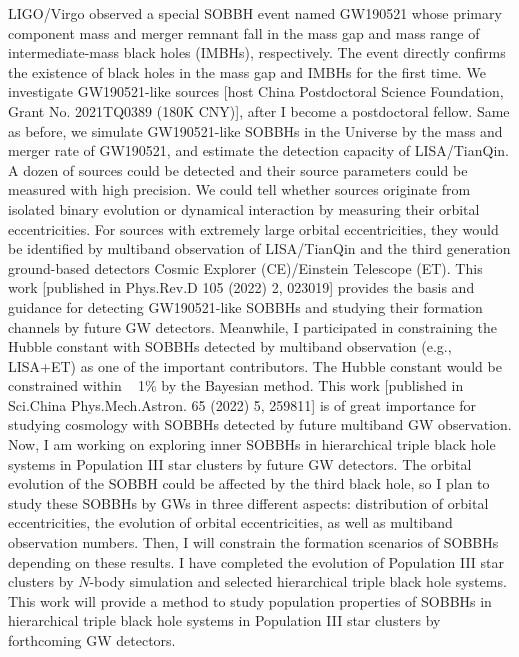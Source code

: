 \documentclass[12pt,a4paper,sans]{article}%
\begin{document}
LIGO/Virgo observed a special SOBBH event named
GW190521 whose primary component mass and merger remnant fall in the mass gap and mass range of intermediate-mass black holes (IMBHs), respectively. The event directly confirms the existence of
black holes in the mass gap and IMBHs for the first time. We investigate GW190521-like sources [host China Postdoctoral Science Foundation, Grant No. 2021TQ0389 (180K CNY)], after I become a postdoctoral fellow. Same as before, we simulate GW190521-like SOBBHs in the
Universe by the mass and merger rate of GW190521, and estimate the detection capacity of LISA/TianQin. A dozen of sources could be detected and their source
parameters could be measured with high precision. We could tell whether sources originate from isolated binary evolution or dynamical interaction by measuring their orbital eccentricities. For sources with extremely large orbital
eccentricities, they would be identified by multiband observation of LISA/TianQin and the third generation ground-based detectors Cosmic Explorer (CE)/Einstein
Telescope (ET). This work [published in Phys.Rev.D 105 (2022) 2, 023019] provides
the basis and guidance for detecting GW190521-like SOBBHs and studying their formation channels by future GW detectors. Meanwhile, I participated in constraining the Hubble
constant with SOBBHs detected by multiband observation (e.g., LISA+ET) as one of the important
contributors. The Hubble constant would be constrained within ~ 1\% by the Bayesian method. This work [published in Sci.China Phys.Mech.Astron. 65 (2022) 5, 259811] is of great
importance for studying cosmology with SOBBHs detected by future multiband GW observation. Now, I am working on
exploring inner SOBBHs in hierarchical triple black hole systems in Population III star clusters by future GW detectors. The orbital evolution of the SOBBH could be affected by the third black hole, so I plan to
study these SOBBHs by GWs in three different aspects: distribution of orbital
eccentricities, the evolution of orbital eccentricities, as well as multiband observation numbers. Then, I will constrain the formation scenarios of SOBBHs depending on these results. I have completed the evolution of
Population III star clusters by $N$-body simulation and selected hierarchical triple black hole systems. This work will provide a method 
to study population properties of SOBBHs in hierarchical triple black hole systems in Population III star clusters by forthcoming GW detectors.
\end{document}
